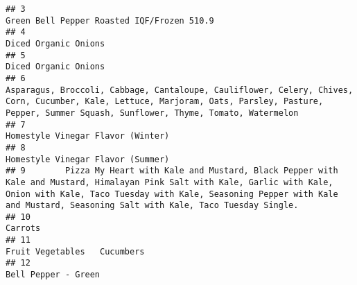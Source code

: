 \documentclass[]{article}
\begin{document}
\begin{verbatim}
## 3                                                                                                                                                                                                                        Green Bell Pepper Roasted IQF/Frozen 510.9
## 4                                                                                                                                                                                                                                              Diced Organic Onions
## 5                                                                                                                                                                                                                                              Diced Organic Onions
## 6                                                               Asparagus, Broccoli, Cabbage, Cantaloupe, Cauliflower, Celery, Chives, Corn, Cucumber, Kale, Lettuce, Marjoram, Oats, Parsley, Pasture, Pepper, Summer Squash, Sunflower, Thyme, Tomato, Watermelon
## 7                                                                                                                                                                                                                                 Homestyle Vinegar Flavor (Winter)
## 8                                                                                                                                                                                                                                 Homestyle Vinegar Flavor (Summer)
## 9        Pizza My Heart with Kale and Mustard, Black Pepper with Kale and Mustard, Himalayan Pink Salt with Kale, Garlic with Kale, Onion with Kale, Taco Tuesday with Kale, Seasoning Pepper with Kale and Mustard, Seasoning Salt with Kale, Taco Tuesday Single.
## 10                                                                                                                                                                                                                                                          Carrots
## 11                                                                                                                                                                                                                                  Fruit Vegetables   Cucumbers   
## 12                                                                                                                                                                                                                                              Bell Pepper - Green

\end{verbatim}
\end{document}
